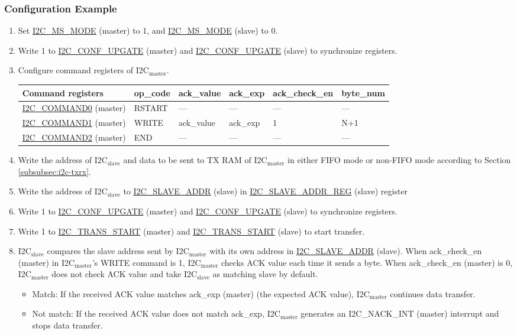 \documentclass[main\_\_EN.tex]{subfiles}
\begin{document}
\subsubsection{Configuration Example}
\begin{enumerate}
\item Set \hyperref[fielddesc:I2CMSMODE]{I2C\_MS\_MODE} (master) to 1, and \hyperref[fielddesc:I2CMSMODE]{I2C\_MS\_MODE} (slave) to 0.
\item Write 1 to \hyperref[fielddesc:I2CCONFUPGATE]{I2C\_CONF\_UPGATE} (master) and \hyperref[fielddesc:I2CCONFUPGATE]{I2C\_CONF\_UPGATE} (slave) to synchronize registers.
\item Configure command registers of I2C$_\text{master}$.
\begin{longtable}{ | p{4cm} | p{2cm} | p{2cm} | p{2cm} |p{2cm} | p{2cm} |}
\hline\rowcolor{lightgray}
Command registers& op\_code & ack\_value&ack\_exp&ack\_check\_en&byte\_num  \\ \hline
\hyperref[fielddesc:I2CCOMMAND0]{I2C\_COMMAND0} (master)& RSTART& ---&---&---&---  \\ \hline
\hyperref[fielddesc:I2CCOMMAND1]{I2C\_COMMAND1} (master)& WRITE& ack\_value&ack\_exp&1&N+1  \\ \hline
\hyperref[fielddesc:I2CCOMMAND2]{I2C\_COMMAND2} (master)& END& ---&---&---&---  \\ \hline
\end{longtable}
\item Write the address of I2C$_\text{slave}$ and data to be sent to TX RAM of I2C$_\text{master}$ in either FIFO mode or non-FIFO mode according to Section \ref{subsubsec:i2c-txrx}.
\item Write the address of I2C$_\text{slave}$ to \hyperref[fielddesc:I2CSLAVEADDR]{I2C\_SLAVE\_ADDR} (slave) in \hyperref[regdesc:I2CSLAVEADDRREG]{I2C\_SLAVE\_ADDR\_REG} (slave) register
\item Write 1 to \hyperref[fielddesc:I2CCONFUPGATE]{I2C\_CONF\_UPGATE} (master) and \hyperref[fielddesc:I2CCONFUPGATE]{I2C\_CONF\_UPGATE} (slave) to synchronize registers.
\item Write 1 to \hyperref[fielddesc:I2CTRANSSTART]{I2C\_TRANS\_START} (master) and \hyperref[fielddesc:I2CTRANSSTART]{I2C\_TRANS\_START} (slave) to start transfer.
\item I2C$_\text{slave}$ compares the slave address sent by I2C$_\text{master}$ with its own address in \hyperref[fielddesc:I2CSLAVEADDR]{I2C\_SLAVE\_ADDR} (slave). When ack\_check\_en (master) in I2C$_\text{master}$'s WRITE command is 1, I2C$_\text{master}$ checks ACK value each time it sends a byte. When ack\_check\_en (master) is 0, I2C$_\text{master}$ does not check ACK value and take I2C$_\text{slave}$ as matching slave by default.
\begin{itemize}
\item Match: If the received ACK value matches ack\_exp (master) (the expected ACK value), I2C$_\text{master}$ continues data transfer.
\item Not match: If the received ACK value does not match ack\_exp, I2C$_\text{master}$ generates an I2C\_NACK\_INT (master) interrupt and stops data transfer.
\end{itemize}


\end{enumerate}
\end{document}
